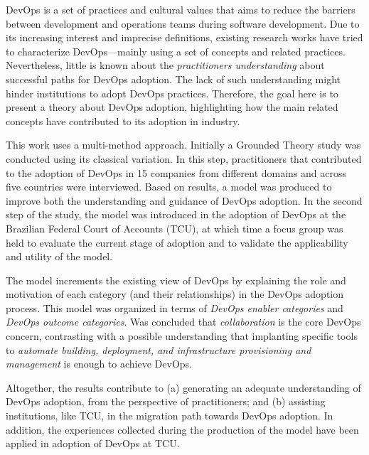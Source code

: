 DevOps is a set of practices and cultural values that aims to reduce the
barriers between development and operations teams during software development.
Due to its increasing interest and imprecise definitions, existing research
works have tried to characterize DevOps---mainly using a set of concepts and
related practices. Nevertheless, little is known about the \emph{practitioners
understanding} about successful paths for DevOps adoption. The lack of such
understanding might hinder institutions to adopt DevOps practices. Therefore,
the goal here is to present a theory about DevOps adoption, highlighting how the
main related concepts have contributed to its adoption in industry.

This work uses a multi-method approach. Initially a Grounded Theory study was
conducted using its classical variation. In this step, practitioners
that contributed to the adoption of DevOps in 15 companies from different
domains and across five countries were interviewed. Based on results, a model
was produced to improve both the understanding and guidance of DevOps adoption.
In the second step of the study, the model was introduced in the adoption of
DevOps at the Brazilian Federal Court of Accounts (TCU), at which time a focus
group was held to evaluate the current stage of adoption and to validate the
applicability and utility of the model.

The model increments the existing view of DevOps by explaining the role and
motivation of each category (and their relationships) in the DevOps adoption
process. This model was organized in terms of \emph{DevOps enabler categories}
and \emph{DevOps outcome categories}. Was concluded that \emph{collaboration} is
the core DevOps concern, contrasting with a possible understanding that
implanting specific tools to \emph{automate building, deployment, and
infrastructure provisioning and management} is enough to achieve DevOps.

Altogether, the results contribute to (a) generating an adequate understanding
of DevOps adoption, from the perspective of practitioners; and (b) assisting
institutions, like \acrshort{TCU}, in the migration path towards DevOps
adoption. In addition, the experiences collected during the production of the
model have been applied in adoption of DevOps at TCU.
